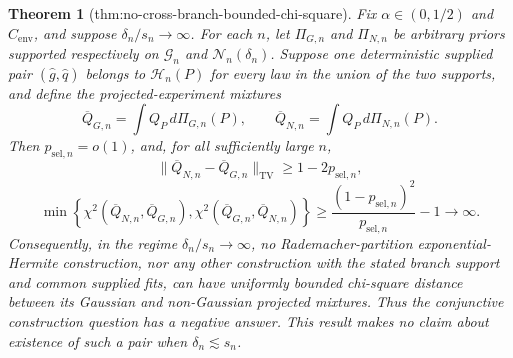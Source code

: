 \documentclass{article}
\newtheorem{theorem}{Theorem}
\begin{document}
\begin{theorem}[thm:no-cross-branch-bounded-chi-square]\label{thm:no-cross-branch-bounded-chi-square}
Fix \(\alpha\in(0,1/2)\) and \(C_{\mathrm{env}}\), and suppose \(\delta_n/s_n\to\infty\).  For each \(n\), let \(\Pi_{G,n}\) and \(\Pi_{N,n}\) be arbitrary priors supported respectively on \(\mathcal G_n\) and \(\mathcal N_n(\delta_n)\).  Suppose one deterministic supplied pair \((\widehat g,\widehat q)\) belongs to \(\mathcal H_n(P)\) for every law in the union of the two supports, and define the projected-experiment mixtures
\[
 \overline Q_{G,n}=\int Q_P\,d\Pi_{G,n}(P),
 \qquad
 \overline Q_{N,n}=\int Q_P\,d\Pi_{N,n}(P).
\]
Then \(p_{\mathrm{sel},n}=o(1)\), and, for all sufficiently large \(n\),
\[
 \|\overline Q_{N,n}-\overline Q_{G,n}\|_{\mathrm{TV}}
 \ge1-2p_{\mathrm{sel},n},
\]
\[
 \min\left\{
 \chi^2(\overline Q_{N,n},\overline Q_{G,n}),
 \chi^2(\overline Q_{G,n},\overline Q_{N,n})
 \right\}
 \ge \frac{(1-p_{\mathrm{sel},n})^2}{p_{\mathrm{sel},n}}-1
 \longrightarrow\infty.
\]
Consequently, in the regime \(\delta_n/s_n\to\infty\), no Rademacher-partition exponential-Hermite construction, nor any other construction with the stated branch support and common supplied fits, can have uniformly bounded chi-square distance between its Gaussian and non-Gaussian projected mixtures.  Thus the conjunctive construction question has a negative answer.  This result makes no claim about existence of such a pair when \(\delta_n\lesssim s_n\).
\end{theorem}
\end{document}
